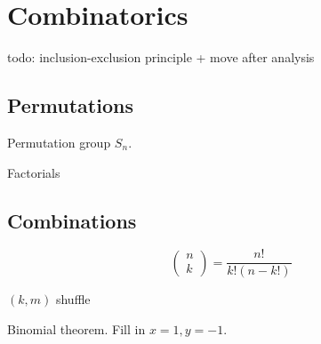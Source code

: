 \chapter{Combinatorics}
todo: inclusion-exclusion principle + move after analysis
\section{Permutations}
Permutation group $S_n$.

Factorials

\section{Combinations}

\[ \begin{pmatrix}
n \\ k
\end{pmatrix} = \frac{n!}{k!(n-k!)}\]


$(k,m)$ shuffle

Binomial theorem. Fill in $x=1, y=-1$.

